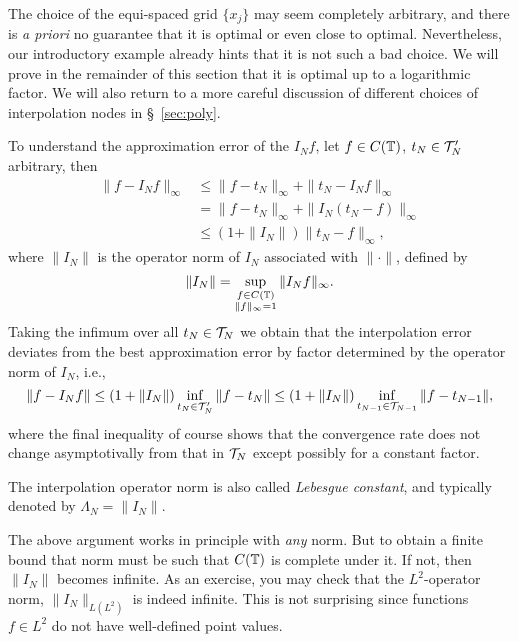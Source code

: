 \medskip 

\begin{remark} 
  The choice of the equi-spaced grid $\{x_j\}$ may seem completely arbitrary,
  and there is {\it a priori} no guarantee that it is optimal or even close to
  optimal. Nevertheless, our introductory example already hints that it is not
  such a bad choice. We will prove in the remainder of this section that it is
  optimal up to a logarithmic factor. We will also return to a more careful
  discussion of different choices of interpolation nodes in \S~\ref{sec:poly}.
\end{remark}

To understand the approximation error of the $I_N f$, let $f \in C(\mathbb{T})$, $t_N
\in \mathcal{T}_N'$ arbitrary, then
\begin{align*}
  \|f - I_N f \|_\infty &\leq \|f - t_N \|_\infty + \| t_N - I_N f\|_\infty \\
    & = \|f - t_N \|_\infty + \| I_N (t_N - f) \|_\infty \\
    & \leq (1 + \|I_N\|) \| t_N - f \|_\infty,
\end{align*}
where $\|I_N\|$ is the operator norm of $I_N$ associated with $\|\cdot\|$, 
defined by 
\[
    \| I_N \| = \sup_{\substack{f \in C(\mathbb{T}) \\ \|f\|_\infty = 1}} \| I_N f \|_\infty.
\]
Taking the infimum over all $t_N \in \mathcal{T}_N$ we obtain that the
interpolation error deviates from the best approximation error by
factor determined by the operator norm of $I_N$, i.e.,
\[
    \|f - I_N f \| \leq (1 + \|I_N\|) \inf_{t_N \in \mathcal{T}_N'} \|f - t_N \|
    \leq (1 + \|I_N\|) \inf_{t_{N-1} \in \mathcal{T}_{N-1}} \|f - t_{N-1} \|,
\]
where the final inequality of course shows that the convergence rate does not
change asymptotivally from that in $\mathcal{T}_N$ except possibly for a constant
factor.

\begin{definition}
  The interpolation operator norm is also called {\em Lebesgue constant}, and
  typically denoted by $\Lambda_N = \| I_N \|$.
\end{definition}

\begin{remark}
  The above argument works in principle with {\em any} norm. But to obtain a
  finite bound that norm must be such that $C(\mathbb{T})$ is complete under it. If
  not, then $\|I_N\|$ becomes infinite. As an exercise, you may check that the
  $L^2$-operator norm, $\|I_N\|_{L(L^2)}$ is indeed infinite. This is not
  surprising since functions $f \in L^2$ do not have well-defined point values.
\end{remark}

